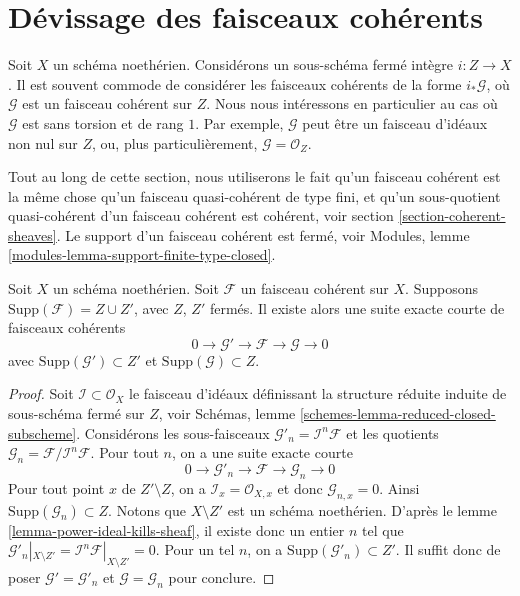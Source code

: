 \section{Dévissage des faisceaux cohérents}
\label{section-devissage}

\noindent
Soit $X$ un schéma noethérien. Considérons un sous-schéma fermé intègre
$i : Z \to X$. Il est souvent commode de considérer les faisceaux cohérents de
la forme $i_*\mathcal{G}$, où $\mathcal{G}$ est un faisceau cohérent sur
$Z$. Nous nous intéressons en particulier au cas où $\mathcal{G}$
est sans torsion et de rang $1$. Par exemple, $\mathcal{G}$ peut être
un faisceau d'idéaux non nul sur $Z$, ou, plus particulièrement,
$\mathcal{G} = \mathcal{O}_Z$.

\medskip\noindent
Tout au long de cette section, nous utiliserons le fait qu'un faisceau
cohérent est la même chose qu'un faisceau quasi-cohérent de type fini, et
qu'un sous-quotient quasi-cohérent d'un faisceau cohérent est cohérent, voir
section \ref{section-coherent-sheaves}.
Le support d'un faisceau cohérent est fermé, voir
Modules, lemme \ref{modules-lemma-support-finite-type-closed}.

\begin{lemma}
\label{lemma-prepare-filter-support}
Soit $X$ un schéma noethérien.
Soit $\mathcal{F}$ un faisceau cohérent sur $X$.
Supposons $\text{Supp}(\mathcal{F}) = Z \cup Z'$, avec $Z$, $Z'$ fermés.
Il existe alors une suite exacte courte de faisceaux cohérents
$$
0 \to \mathcal{G}' \to \mathcal{F} \to \mathcal{G} \to 0
$$
avec $\text{Supp}(\mathcal{G}') \subset Z'$ et
$\text{Supp}(\mathcal{G}) \subset Z$.
\end{lemma}

\begin{proof}
Soit $\mathcal{I} \subset \mathcal{O}_X$ le faisceau d'idéaux définissant la
structure réduite induite de sous-schéma fermé sur $Z$, voir
Schémas, lemme \ref{schemes-lemma-reduced-closed-subscheme}.
Considérons les sous-faisceaux
$\mathcal{G}'_n = \mathcal{I}^n\mathcal{F}$ et les
quotients $\mathcal{G}_n = \mathcal{F}/\mathcal{I}^n\mathcal{F}$.
Pour tout $n$, on a une suite exacte courte
$$
0 \to \mathcal{G}'_n \to \mathcal{F} \to \mathcal{G}_n \to 0
$$
Pour tout point $x$ de $Z' \setminus Z$, on a
$\mathcal{I}_x = \mathcal{O}_{X, x}$
et donc $\mathcal{G}_{n, x} = 0$. Ainsi
$\text{Supp}(\mathcal{G}_n) \subset Z$. Notons que $X \setminus Z'$
est un schéma noethérien. D'après le lemme \ref{lemma-power-ideal-kills-sheaf},
il existe donc un entier $n$ tel que
$\mathcal{G}'_n|_{X \setminus Z'} =
\mathcal{I}^n\mathcal{F}|_{X \setminus Z'} = 0$.
Pour un tel $n$, on a $\text{Supp}(\mathcal{G}'_n) \subset Z'$. Il
suffit donc de poser
$\mathcal{G}' = \mathcal{G}'_n$ et $\mathcal{G} = \mathcal{G}_n$
pour conclure.
\end{proof}

